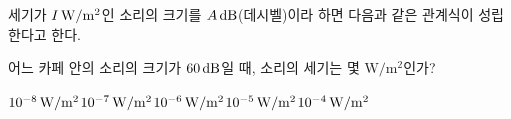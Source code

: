 세기가 $I\mkern3mu \mathrm{W/m^2}$인 소리의 크기를 $A\mkern3mu \mathrm{dB}$(데시벨)이라 하면 다음과 같은 관계식이 성립한다고 한다.\par\smallskip{}\par\smallskip\noindent 어느 카페 안의 소리의 크기가 $60\mkern3mu \mathrm{dB}$일 때, 소리의 세기는 몇 $\mathrm{W/m^2}$인가?
\begin{choicesii}{$10^{-8}\mkern3mu \mathrm{W/m^2}$}{$10^{-7}\mkern3mu \mathrm{W/m^2}$}{$10^{-6}\mkern3mu \mathrm{W/m^2}$}{$10^{-5}\mkern3mu \mathrm{W/m^2}$}{$10^{-4}\mkern3mu \mathrm{W/m^2}$}\end{choicesii}
